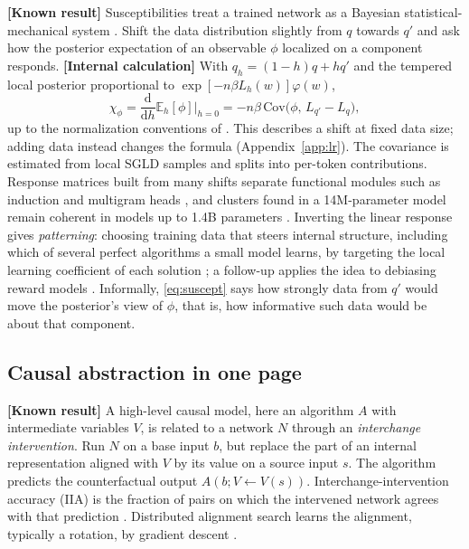 \documentclass[11pt,a4paper]{article}
\newcommand{\E}{\mathbb E}
\newcommand{\dd}{\mathrm d}
\newcommand{\evl}[2]{{\small\bfseries\color{#1}[#2]}}
\newcommand{\LKnown}{\evl{cknown}{Known result}}
\newcommand{\LCalc}{\evl{ccalc}{Internal calculation}}
\begin{document}
\LKnown{} Susceptibilities treat a trained network as a Bayesian
statistical-mechanical system \cite{baker2026}. Shift the data distribution
slightly from $q$ towards $q'$ and ask how the posterior expectation of an
observable $\phi$ localized on a component responds. \LCalc{} With
$q_h=(1-h)q+hq'$ and the tempered local posterior proportional to
$\exp[-n\beta L_h(w)]\varphi(w)$,
\begin{equation}
\chi_\phi=\frac{\dd}{\dd h}\E_h[\phi]\Big|_{h=0}
=-n\beta\,\mathrm{Cov}\bigl(\phi,\,L_{q'}-L_q\bigr),
\label{eq:suscept}
\end{equation}
up to the normalization conventions of \cite{baker2026}. This describes a shift at fixed data size; adding data instead changes the formula (Appendix~\ref{app:lr}). The covariance is
estimated from local SGLD samples and splits into per-token contributions.
Response matrices built from many shifts separate functional modules such
as induction and multigram heads \cite{baker2026}, and clusters found in a
14M-parameter model remain coherent in models up to 1.4B parameters
\cite{gordon2026}. Inverting the linear response gives \emph{patterning}:
choosing training data that steers internal structure, including which of
several perfect algorithms a small model learns, by targeting the local
learning coefficient of each solution \cite{wangmurfet2026}; a follow-up
applies the idea to debiasing reward models \cite{patterningpractice2026}.
Informally, \eqref{eq:suscept} says how strongly data from $q'$ would move the posterior's view of $\phi$, that is, how informative such data would be about that component.

\subsection{Causal abstraction in one page}

\LKnown{} A high-level causal model, here an algorithm $A$ with
intermediate variables $V$, is related to a network $N$ through an
\emph{interchange intervention}. Run $N$ on a base input $b$, but
replace the part of an internal representation aligned with $V$ by its
value on a source input $s$. The algorithm predicts the counterfactual
output $A(b;V\leftarrow V(s))$. Interchange-intervention accuracy (IIA)
is the fraction of pairs on which the intervened network agrees with
that prediction \cite{geiger2025ca}. Distributed alignment search learns
the alignment, typically a rotation, by gradient descent \cite{geiger2024das}.
\end{document}
